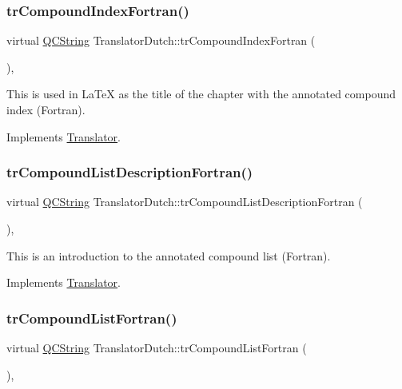 \subsubsection{\texorpdfstring{trCompoundIndexFortran()}{trCompoundIndexFortran()}}
{\footnotesize\ttfamily virtual \mbox{\hyperlink{class_q_c_string}{Q\+C\+String}} Translator\+Dutch\+::tr\+Compound\+Index\+Fortran (\begin{DoxyParamCaption}{ }\end{DoxyParamCaption})\hspace{0.3cm}{\ttfamily [inline]}, {\ttfamily [virtual]}}

This is used in La\+TeX as the title of the chapter with the annotated compound index (Fortran). 

Implements \mbox{\hyperlink{class_translator}{Translator}}.

\mbox{\label{class_translator_dutch_a99a96af0134d09dedff1c939595d5604}} 
\subsubsection{\texorpdfstring{trCompoundListDescriptionFortran()}{trCompoundListDescriptionFortran()}}
{\footnotesize\ttfamily virtual \mbox{\hyperlink{class_q_c_string}{Q\+C\+String}} Translator\+Dutch\+::tr\+Compound\+List\+Description\+Fortran (\begin{DoxyParamCaption}{ }\end{DoxyParamCaption})\hspace{0.3cm}{\ttfamily [inline]}, {\ttfamily [virtual]}}

This is an introduction to the annotated compound list (Fortran). 

Implements \mbox{\hyperlink{class_translator}{Translator}}.

\mbox{\label{class_translator_dutch_aecca430cdc52cd155a13f4de4119e035}} 
\subsubsection{\texorpdfstring{trCompoundListFortran()}{trCompoundListFortran()}}
{\footnotesize\ttfamily virtual \mbox{\hyperlink{class_q_c_string}{Q\+C\+String}} Translator\+Dutch\+::tr\+Compound\+List\+Fortran (\begin{DoxyParamCaption}{ }\end{DoxyParamCaption})\hspace{0.3cm}{\ttfamily [inline]}, {\ttfamily [virtual]}}

